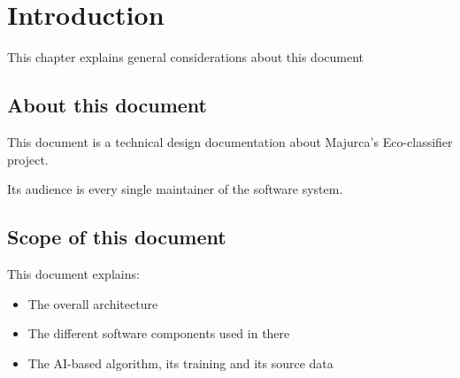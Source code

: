 \chapter{Introduction}
\label{chapter:introduction}

This chapter explains general considerations about this document

\section{About this document}

This document is a technical design documentation about Majurca's Eco-classifier project.

Its audience is every single maintainer of the software system.

\section{Scope of this document}

This document explains:

\begin{itemize}
    \item The overall architecture
    \item The different software components used in there
    \item The AI-based algorithm, its training and its source data
\end{itemize}
